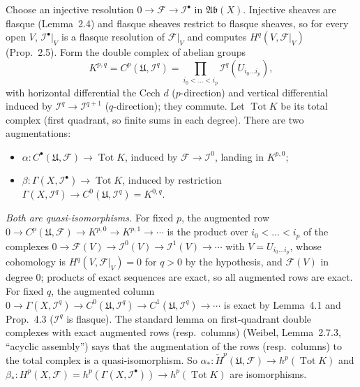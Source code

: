\documentclass[11pt]{article}
\begin{document}
\pf
Choose an injective resolution $0\to\mathcal F\to\mathcal I^\bullet$ in $\mathfrak{Ab}(X)$. Injective sheaves are flasque (Lemma~2.4) and flasque sheaves restrict to flasque sheaves, so for every open $V$, $\mathcal I^\bullet|_V$ is a flasque resolution of $\mathcal F|_V$ and computes $H^q(V,\mathcal F|_V)$ (Prop.~2.5). Form the double complex of abelian groups
\[
K^{p,q}=C^p(\mathfrak U,\mathcal I^q)=\prod_{i_0<\dots<i_p}\mathcal I^q(U_{i_0\dots i_p}),
\]
with horizontal differential the Cech $d$ ($p$-direction) and vertical differential induced by $\mathcal I^q\to\mathcal I^{q+1}$ ($q$-direction); they commute. Let $\operatorname{Tot}K$ be its total complex (first quadrant, so finite sums in each degree). There are two augmentations:
\begin{itemize}
\item $\alpha:C^\bullet(\mathfrak U,\mathcal F)\to\operatorname{Tot}K$, induced by $\mathcal F\to\mathcal I^0$, landing in $K^{p,0}$;
\item $\beta:\Gamma(X,\mathcal I^\bullet)\to\operatorname{Tot}K$, induced by restriction $\Gamma(X,\mathcal I^q)\to C^0(\mathfrak U,\mathcal I^q)=K^{0,q}$.
\end{itemize}
\emph{Both are quasi-isomorphisms.} For fixed $p$, the augmented row $0\to C^p(\mathfrak U,\mathcal F)\to K^{p,0}\to K^{p,1}\to\cdots$ is the product over $i_0<\dots<i_p$ of the complexes $0\to\mathcal F(V)\to\mathcal I^0(V)\to\mathcal I^1(V)\to\cdots$ with $V=U_{i_0\dots i_p}$, whose cohomology is $H^q(V,\mathcal F|_V)=0$ for $q>0$ by the hypothesis, and $\mathcal F(V)$ in degree $0$; products of exact sequences are exact, so all augmented rows are exact. For fixed $q$, the augmented column $0\to\Gamma(X,\mathcal I^q)\to C^0(\mathfrak U,\mathcal I^q)\to C^1(\mathfrak U,\mathcal I^q)\to\cdots$ is exact by Lemma~4.1 and Prop.~4.3 ($\mathcal I^q$ is flasque). The standard lemma on first-quadrant double complexes with exact augmented rows (resp.\ columns) (Weibel, Lemma~2.7.3, ``acyclic assembly'') says that the augmentation of the rows (resp.\ columns) to the total complex is a quasi-isomorphism. So $\alpha_*:\check H^p(\mathfrak U,\mathcal F)\to h^p(\operatorname{Tot}K)$ and $\beta_*:H^p(X,\mathcal F)=h^p(\Gamma(X,\mathcal I^\bullet))\to h^p(\operatorname{Tot}K)$ are isomorphisms.
\end{document}
